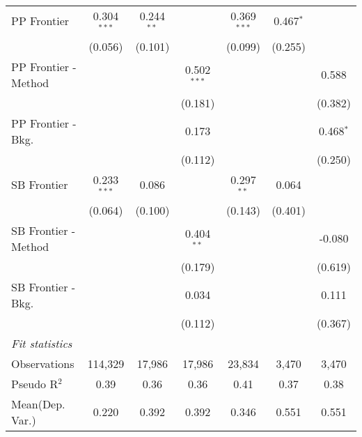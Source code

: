 \begin{tabular}{lcccccc}
   PP Frontier          & 0.304$^{***}$ & 0.244$^{**}$  &               & 0.369$^{***}$ & 0.467$^{*}$ &   \\   
                        & (0.056)       & (0.101)       &               & (0.099)       & (0.255)     &   \\   
   PP Frontier - Method &               &               & 0.502$^{***}$ &               &             & 0.588\\   
                        &               &               & (0.181)       &               &             & (0.382)\\   
   PP Frontier - Bkg.   &               &               & 0.173         &               &             & 0.468$^{*}$\\   
                        &               &               & (0.112)       &               &             & (0.250)\\   
   SB Frontier          & 0.233$^{***}$ & 0.086         &               & 0.297$^{**}$  & 0.064       &   \\   
                        & (0.064)       & (0.100)       &               & (0.143)       & (0.401)     &   \\   
   SB Frontier - Method &               &               & 0.404$^{**}$  &               &             & -0.080\\   
                        &               &               & (0.179)       &               &             & (0.619)\\   
   SB Frontier - Bkg.   &               &               & 0.034         &               &             & 0.111\\   
                        &               &               & (0.112)       &               &             & (0.367)\\   
   \midrule
   \emph{Fit statistics}\\
   Observations         & 114,329       & 17,986        & 17,986        & 23,834        & 3,470       & 3,470\\  
   Pseudo R$^2$         & 0.39          & 0.36          & 0.36          & 0.41          & 0.37        & 0.38\\  
Mean(Dep. Var.) & 0.220 & 0.392 & 0.392 & 0.346 & 0.551 & 0.551 \\
   

\end{tabular}
